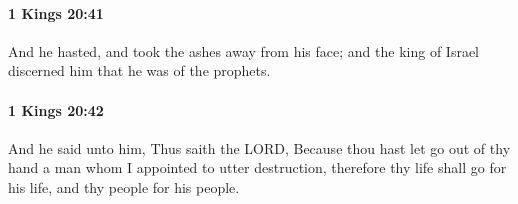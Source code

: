 		\paragraph{1 Kings 20:41} %
			\label{1KINGS-20-41}

			And he hasted, and took the ashes away from his face; and the king of Israel discerned him that he was of the prophets.


		\paragraph{1 Kings 20:42} %
			\label{1KINGS-20-42}

			And he said unto him, Thus saith the LORD, Because thou hast let go out of thy hand a man whom I appointed to utter destruction, therefore thy life shall go for his life, and thy people for his people.


